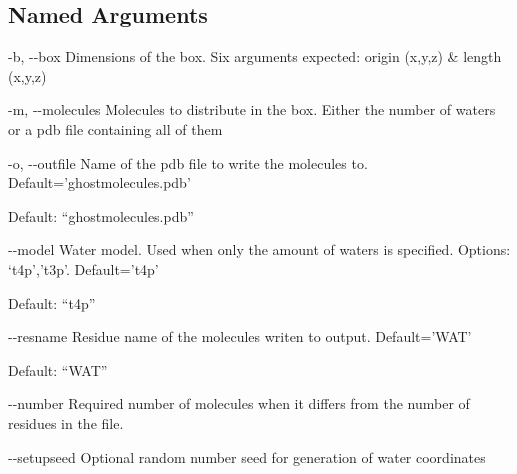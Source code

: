 \documentclass[letterpaper,10pt,english]{sphinxmanual}
\begin{document}
\subsection{Named Arguments}
\label{\detokenize{tools:Named Arguments}}\begin{optionlist}{3cm}
\item [-b, -{-}box]  
Dimensions of the box. Six arguments expected: origin (x,y,z) \& length (x,y,z)
\item [-m, -{-}molecules]  
Molecules to distribute in the box. Either the number of waters or a pdb file containing all of them
\item [-o, -{-}outfile]  
Name of the pdb file to write the molecules to. Default=’ghostmolecules.pdb’

Default: “ghostmolecules.pdb”
\item [-{-}model]  
Water model. Used when only the amount of waters is specified. Options: ‘t4p’,’t3p’. Default=’t4p’

Default: “t4p”
\item [-{-}resname]  
Residue name of the molecules writen to output. Default=’WAT’

Default: “WAT”
\item [-{-}number]  
Required number of molecules when it differs from the number of residues in the file.
\item [-{-}setupseed]  
Optional random number seed for generation of water coordinates
\end{optionlist}


%
\begin{sphinxVerbatim}[commandchars=\\\{\}]
         
             
             
\end{sphinxVerbatim}
\end{document}
